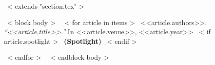 ~< extends "section.tex" >~

~< block body >~
  ~< for article in items >~
    <<article.authors>>. {\it``<<article.title>>.''} In <<article.venue>>, <<article.year>>
    ~< if article.spotlight >~
      {\bf {\color{red}(Spotlight)}}
    ~< endif >~

  ~< endfor >~
~< endblock body >~